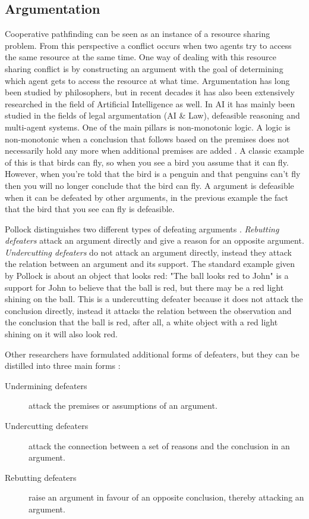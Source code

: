 \subsection{Argumentation}
Cooperative pathfinding can be seen as an instance of a resource sharing
problem. From this perspective a conflict occurs when two agents try to access
the same resource at the same time. One way of dealing with this resource
sharing conflict is by constructing an argument with the goal of determining
which agent gets to access the resource at what time. Argumentation has long
been studied by philosophers, but in recent decades it has also been
extensively researched in
the field of Artificial Intelligence as well. In AI it has mainly been studied
in the fields of legal argumentation (AI \& Law), defeasible reasoning and
multi-agent systems. One of the main pillars is non-monotonic logic. A logic is
non-monotonic when a conclusion that follows based on the premises does not
necessarily hold any more when additional premises are added
\cite{vaneemeren2014}. A classic example of this is that birds can fly, so when
you see a bird you assume that it can fly. However, when you're told that the
bird is a penguin and that penguins can't fly then you will no longer conclude
that the bird can fly. A argument is defeasible when it can be defeated by
other arguments, in the previous example the fact that the bird that you see
can fly is defeasible.

Pollock distinguishes two different types of defeating arguments
\cite{pollock1995}. \emph{Rebutting defeaters} attack an argument directly and
give a reason for an opposite argument. \emph{Undercutting defeaters} do not
attack an argument directly, instead they attack the relation between an
argument and its support. The standard example given by Pollock is about an
object that looks red: "The ball looks red to John" is a support for John to
believe that the ball is red, but there may be a red light shining on the ball.
This is a undercutting defeater because it does not attack the conclusion
directly, instead it attacks the relation between the observation and the
conclusion that the ball is red, after all, a white object with a red light
shining on it will also look red.

Other researchers have formulated additional forms of defeaters, but they can
be distilled into three main forms \cite{vaneemeren2014}:
\begin{description}
	\item[Undermining defeaters] attack the premises or assumptions of an
	argument.
	\item[Undercutting defeaters] attack the connection between a set of
	reasons and the conclusion in an argument.
	\item[Rebutting defeaters] raise an argument in favour of an opposite
	conclusion, thereby attacking an argument.
\end{description}

